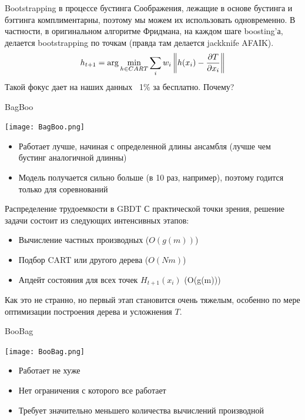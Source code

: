 \documentclass[14pt, fleqn, xcolor={dvipsnames, table}]{beamer}
\begin{document}
\begin{frame}{Bootstrapping в процессе бустинга}
Соображения, лежащие в основе бустинга и бэггинга комплиментарны, поэтому мы можем их использовать одновременно. В частности, в оригинальном алгоритме Фридмана, на каждом шаге boosting'а, делается bootstrapping по точкам (правда там делается jackknife AFAIK).
$$
h_{t+1} = \arg \min_{h \in CART} \sum_i w_i \left\|h(x_i) - {\partial T \over \partial x_i}\right\|
$$
Такой фокус дает на наших данных ~1\% за бесплатно. Почему?
\end{frame}

\begin{frame}{BagBoo}
\begin{center}
\texttt{[image: BagBoo.png]}
\end{center}
\begin{itemize}
  \item Работает лучше, начиная с определенной длины ансамбля (лучше чем бустинг аналогичной длинны)
  \item Модель получается сильно больше (в 10 раз, например), поэтому годится только для соревнований
\end{itemize}
\end{frame}

\begin{frame}{Распределение трудоемкости в GBDT}
С практической точки зрения, решение задачи состоит из следующих интенсивных этапов:
\begin{itemize}
  \item Вычисление частных производных ($O(g(m))$)
  \item Подбор CART или другого дерева ($O(N m)$)
  \item Апдейт состояния для всех точек $H_{t+1}(x_i)$ (O(g(m)))
\end{itemize}
Как это не странно, но первый этап становится очень тяжелым, особенно по мере оптимизации построения дерева и усложнения $T$.
\end{frame}

\begin{frame}{BooBag}
\begin{center}
\texttt{[image: BooBag.png]}
\end{center}
\begin{itemize}
  \item Работает не хуже
  \item Нет ограничения с которого все работает
  \item Требует значительно меньшего количества вычислений производной
\end{itemize}
\end{frame}
\end{document}
